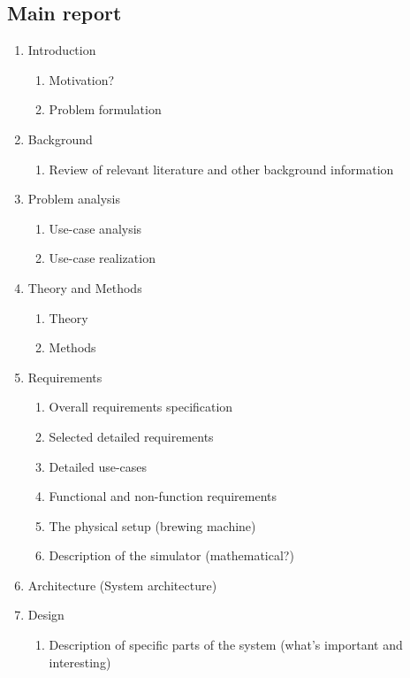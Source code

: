 \subsection{Main report}
\begin{enumerate}
    \item Introduction
        \begin{enumerate}
            \item Motivation?
            \item Problem formulation
        \end{enumerate}
    \item Background
        \begin{enumerate}
            \item Review of relevant literature and other background information
        \end{enumerate}
    \item Problem analysis
        \begin{enumerate}
            \item Use-case analysis
            \item Use-case realization
        \end{enumerate}
    \item Theory and Methods
        \begin{enumerate}
            \item Theory
            \item Methods
        \end{enumerate}
    \item Requirements
        \begin{enumerate}
            \item Overall requirements specification
            \item Selected detailed requirements
            \item Detailed use-cases
            \item Functional and non-function requirements
            \item The physical setup (brewing machine)
            \item Description of the simulator (mathematical?)
        \end{enumerate}
    \item Architecture (System architecture)
    \item Design
        \begin{enumerate}
            \item Description of specific parts of the system (what's important and interesting)

\end{enumerate}
\end{enumerate}
